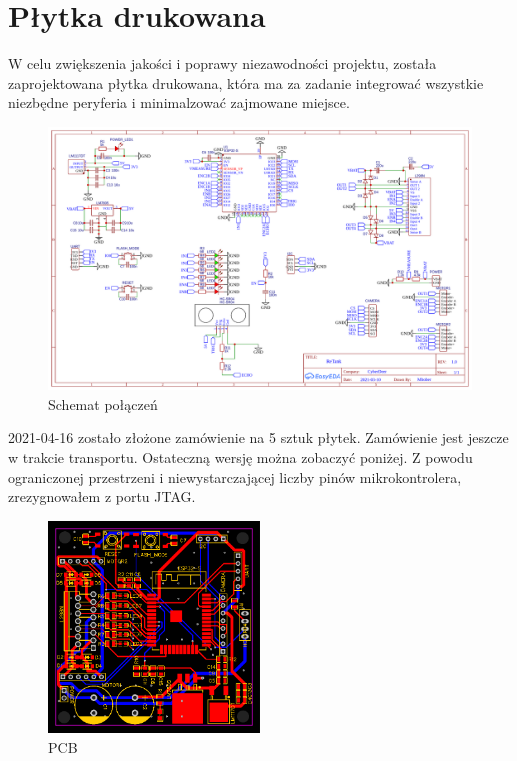 \documentclass[10pt, a4paper]{article}
\begin{document}
\section{Płytka drukowana}
W celu zwiększenia jakości i poprawy niezawodności projektu, 
została zaprojektowana płytka drukowana, która ma za zadanie
integrować wszystkie niezbędne peryferia i minimalzować zajmowane miejsce. 

\begin{figure}[H]
	\centering
	\includegraphics[width=1\textwidth]{figures/schematic.png}
	\caption{Schemat połączeń}
	\label{fig:schematic}
\end{figure}

2021-04-16 zostało złożone zamówienie na 5 sztuk płytek.
Zamówienie jest jeszcze w trakcie transportu. Ostateczną wersję 
można zobaczyć poniżej. Z powodu ograniczonej przestrzeni i
niewystarczającej liczby pinów mikrokontrolera, zrezygnowałem z
portu JTAG.

\begin{figure}[H]
	\centering
	\includegraphics[width=0.5\textwidth]{figures/pcb.png}
	\caption{PCB}
	\label{fig:pcb}
\end{figure}
\end{document}
